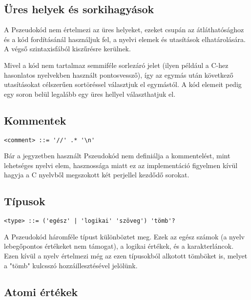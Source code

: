 \subsection{Üres helyek és sorkihagyások}

A Pszeudokód nem értelmezi az üres helyeket, ezeket csupán az átláthatósághoz és a kód fordításánál használjuk fel, a nyelvi elemek és utasítások elhatárolására. A végső szintaxisfából kiszűrésre kerülnek.

Mivel a kód nem tartalmaz semmiféle sorlezáró jelet (ilyen például a C-hez hasonlatos nyelvekben használt pontosvessző), így az egymás után következő utasításokat célszerűen sortöréssel választjuk el egymástól. A kód elemeit pedig egy soron belül legalább egy üres hellyel választhatjuk el.

\subsection{Kommentek}

\begin{footnotesize}
\begin{verbatim}
<comment> ::= '//' .* '\n'
\end{verbatim}
\end{footnotesize}

Bár a jegyzetben használt Pszeudokód nem definiálja a kommentelést, mint lehetséges nyelvi elem, hasznossága miatt ez az implementáció figyelmen kívül hagyja a C nyelvből megszokott két perjellel kezdődő sorokat.

\subsection{Típusok}

\begin{footnotesize}
\begin{verbatim}
<type> ::= ('egész' | 'logikai' 'szöveg') 'tömb'?
\end{verbatim}
\end{footnotesize}

A Pszeudokód háromféle típust különböztet meg. Ezek az egész számok (a nyelv lebegőpontos értékeket nem támogat), a logikai értékek, és a karakterláncok. Ezen kívül a nyelv értelmezi még az ezen típusokból alkotott tömböket is, melyet a "tömb" kulcsszó hozzáillesztésével jelölünk.

\subsection{Atomi értékek}

